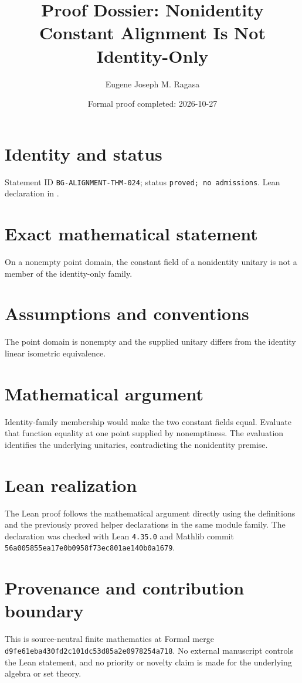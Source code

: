 \documentclass[11pt]{article}
\title{Proof Dossier: Nonidentity Constant Alignment Is Not Identity-Only}
\author{Eugene Joseph M. Ragasa}
\date{Formal proof completed: 2026-10-27}
\begin{document}
\raggedright
\maketitle

\section{Identity and status}
Statement ID \texttt{BG-ALIGNMENT-THM-024}; status \texttt{proved; no admissions}.  Lean declaration
 in
.

\section{Exact mathematical statement}
On a nonempty point domain, the constant field of a nonidentity unitary is not a member of the identity-only family.

\section{Assumptions and conventions}
The point domain is nonempty and the supplied unitary differs from the identity linear isometric equivalence.

\section{Mathematical argument}
Identity-family membership would make the two constant fields equal.  Evaluate that function equality at one point supplied by nonemptiness.  The evaluation identifies the underlying unitaries, contradicting the nonidentity premise.

\section{Lean realization}
The Lean proof follows the mathematical argument directly using the definitions and the
previously proved helper declarations in the same module family.  The declaration was checked
with Lean \texttt{4.35.0} and Mathlib commit \texttt{56a005855ea17e0b0958f73ec801ae140b0a1679}.

\section{Provenance and contribution boundary}
This is source-neutral finite mathematics at Formal merge
\texttt{d9fe61eba430fd2c101dc53d85a2e0978254a718}.  No external manuscript controls the Lean statement, and no priority or
novelty claim is made for the underlying algebra or set theory.
\end{document}
